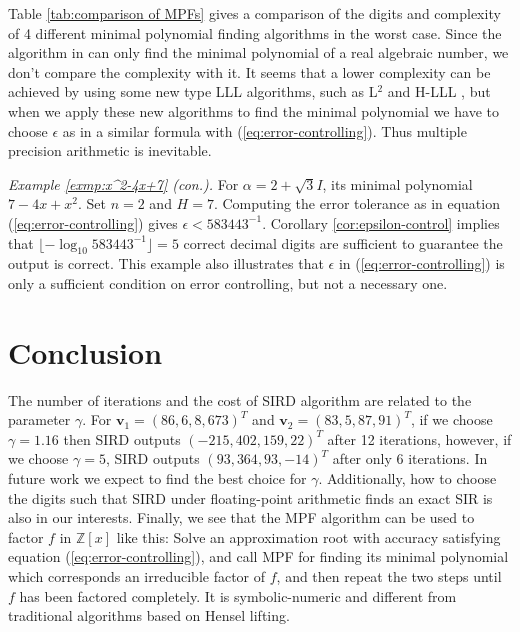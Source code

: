 \documentclass{sig-alternate}
\numberwithin{theorem}{section} \numberwithin{equation}{section}
\begin{document}
Table \ref{tab:comparison of MPFs} gives a comparison of the digits
and complexity of 4 different minimal polynomial finding algorithms
in the worst case. Since the algorithm in \cite{QFC2009} can only find the minimal
polynomial of a real algebraic number, we don't compare the
complexity with it. It seems that a lower complexity can be achieved
by using some new type LLL algorithms, such as L$^2$ \cite{NS2005}
and H-LLL \cite{MSV2009}, but when we apply these new algorithms to
find the minimal polynomial we have to choose $\epsilon$ as in a
similar formula with (\ref{eq:error-controlling}). Thus multiple
precision arithmetic is inevitable.










\vspace{2 mm}

\emph{Example \ref{exmp:x^2-4x+7} (con.).} For $\alpha = 2 +
\sqrt{3} I$, its minimal polynomial $7-4x+x^2$. Set $n = 2$ and $H =
7$. Computing the error tolerance as in equation
(\ref{eq:error-controlling}) gives $\epsilon <583443^{-1}$.
Corollary \ref{cor:epsilon-control} implies that
$\lfloor-\log_{10}583443^{-1}\rfloor = 5$ correct decimal digits are
sufficient to guarantee the output is correct. This example also
illustrates that $\epsilon$ in (\ref{eq:error-controlling}) is only
a sufficient condition on error controlling, but not a necessary
one.







\section{Conclusion}\label{sec:conclude}

The number of iterations and the cost of SIRD algorithm are related
to the parameter $\gamma$. For $\mathbf{v}_1=(86,  6, 8, 673)^T$ and
$\mathbf{v}_2=(83, 5, 87, 91)^T$, if we choose $\gamma=1.16$ then
SIRD outputs $(-215, 402, 159, 22)^T$ after 12 iterations, however,
if we choose $\gamma=5$, SIRD outputs  $(93, 364, 93, -14)^T$ after
only 6 iterations. In future work we expect to find the best choice
for $\gamma$. Additionally, how to choose the digits such that SIRD
under floating-point arithmetic finds an exact SIR is also in our
interests.
Finally, we see that the MPF algorithm can be used to factor $f$ in
$\mathbb{Z}[x]$ like this: Solve an approximation root with accuracy
satisfying  equation (\ref{eq:error-controlling}), and  call MPF for
finding its minimal polynomial which corresponds an irreducible
factor of $f$, and then repeat the two steps until $f$ has been
factored completely.
It is symbolic-numeric  and different from traditional algorithms
based on Hensel lifting.\vspace{1 mm}
\end{document}
